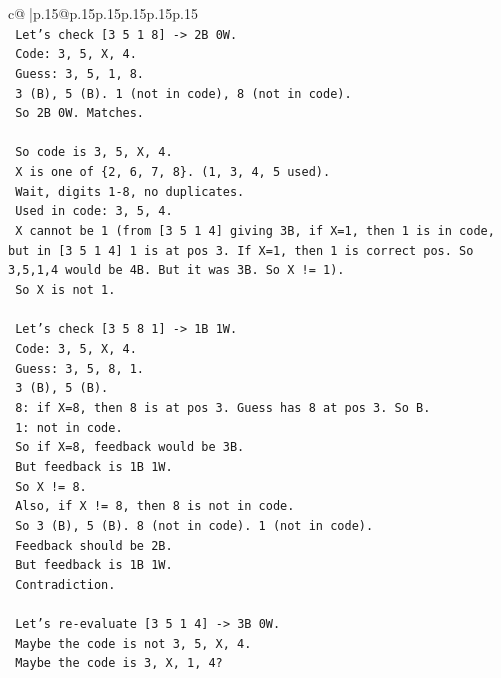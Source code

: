 \documentclass{article}
\begin{document}
{\begin{supertabular}{c@{$\;$}|p{.15\linewidth}@{}p{.15\linewidth}p{.15\linewidth}p{.15\linewidth}p{.15\linewidth}p{.15\linewidth}}
{{{\\ 
\texttt{   Let's check {[}3 5 1 8{]} {-}> 2B 0W.} \\
\texttt{   Code: 3, 5, X, 4.} \\
\texttt{   Guess: 3, 5, 1, 8.} \\
\texttt{   3 (B), 5 (B). 1 (not in code), 8 (not in code).} \\
\texttt{   So 2B 0W. Matches.} \\
\\ 
\texttt{   So code is 3, 5, X, 4.} \\
\texttt{   X is one of \{2, 6, 7, 8\}. (1, 3, 4, 5 used).} \\
\texttt{   Wait, digits 1{-}8, no duplicates.} \\
\texttt{   Used in code: 3, 5, 4.} \\
\texttt{   X cannot be 1 (from {[}3 5 1 4{]} giving 3B, if X=1, then 1 is in code, but in {[}3 5 1 4{]} 1 is at pos 3. If X=1, then 1 is correct pos. So 3,5,1,4 would be 4B. But it was 3B. So X != 1).} \\
\texttt{   So X is not 1.} \\
\\ 
\texttt{   Let's check {[}3 5 8 1{]} {-}> 1B 1W.} \\
\texttt{   Code: 3, 5, X, 4.} \\
\texttt{   Guess: 3, 5, 8, 1.} \\
\texttt{   3 (B), 5 (B).} \\
\texttt{   8: if X=8, then 8 is at pos 3. Guess has 8 at pos 3. So B.} \\
\texttt{   1: not in code.} \\
\texttt{   So if X=8, feedback would be 3B.} \\
\texttt{   But feedback is 1B 1W.} \\
\texttt{   So X != 8.} \\
\texttt{   Also, if X != 8, then 8 is not in code.} \\
\texttt{   So 3 (B), 5 (B). 8 (not in code). 1 (not in code).} \\
\texttt{   Feedback should be 2B.} \\
\texttt{   But feedback is 1B 1W.} \\
\texttt{   Contradiction.} \\
\\ 
\texttt{   Let's re{-}evaluate {[}3 5 1 4{]} {-}> 3B 0W.} \\
\texttt{   Maybe the code is not 3, 5, X, 4.} \\
\texttt{   Maybe the code is 3, X, 1, 4?} \\
}}}
\end{supertabular}}
\end{document}
